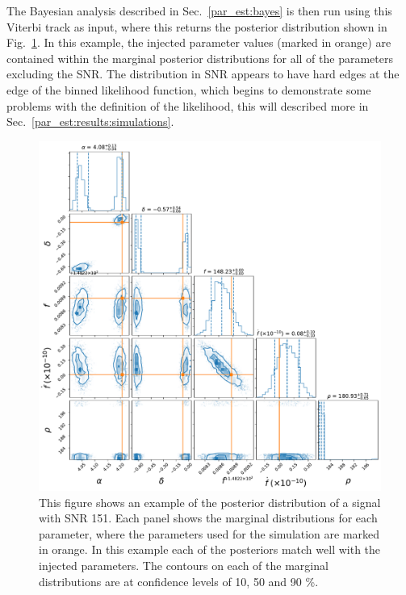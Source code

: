 The Bayesian analysis described in Sec.~\ref{par_est:bayes} is then run using
this Viterbi track as input, where this returns the posterior distribution
shown in Fig.~\ref{par_est:results:example_posterior}.  In this example, the
injected parameter values (marked in orange) are contained within the marginal
posterior distributions for all of the parameters excluding the \gls{SNR}.  The
distribution in \gls{SNR} appears to have hard edges at the edge of the binned
likelihood function, which begins to demonstrate some problems with the
definition of the likelihood, this will described more in Sec.~\ref{par_est:results:simulations}.
%
\begin{figure}[pt]
    \centering
    \includegraphics[width=\linewidth]{C5_parameter/cornerplot.pdf}
    \caption[Posterior distribution of an example Viterbi track]{This figure shows
an example of the posterior distribution of a signal with \gls{SNR} 151. Each
panel shows the marginal distributions for each parameter, where the parameters
used for the simulation are marked in orange. In this example each of the
posteriors match well with the injected parameters.
The contours on each of the marginal distributions are at confidence levels of 10, 50 and 90 \%.}
\label{par_est:results:example_posterior}    
\end{figure}
%

